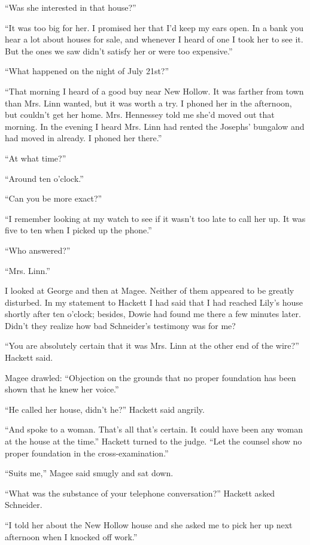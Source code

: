 {“Was she interested in that house?”

“It was too big for her. I promised her that I’d keep my ears open. In a bank you hear a lot about houses for sale, and whenever I heard of one I took her to see it. But the ones we saw didn’t satisfy her or were too expensive.”

“What happened on the night of July 21st?”

“That morning I heard of a good buy near New Hollow. It was farther from town than Mrs. Linn wanted, but it was worth a try. I phoned her in the afternoon, but couldn’t get her home. Mrs. Hennessey told me she’d moved out that morning. In the evening I heard Mrs. Linn had rented the Josephs’ bungalow and had moved in already. I phoned her there.”

“At what time?”

“Around ten o’clock.”

“Can you be more exact?”

“I remember looking at my watch to see if it wasn’t too late to call her up. It was five to ten when I picked up the phone.”

“Who answered?”

“Mrs. Linn.”

I looked at George and then at Magee. Neither of them appeared to be greatly disturbed. In my statement to Hackett I had said that I had reached Lily’s house shortly after ten o’clock; besides, Dowie had found me there a few minutes later. Didn’t they realize how bad Schneider’s testimony was for me?

“You are absolutely certain that it was Mrs. Linn at the other end of the wire?” Hackett said.

Magee drawled: “Objection on the grounds that no proper foundation has been shown that he knew her voice.”

“He called her house, didn’t he?” Hackett said angrily.

“And spoke to a woman. That’s all that’s certain. It could have been any woman at the house at the time.” Hackett turned to the judge. “Let the counsel show no proper foundation in the cross-examination.”

“Suits me,” Magee said smugly and sat down.

“What was the substance of your telephone conversation?” Hackett asked Schneider.

“I told her about the New Hollow house and she asked me to pick her up next afternoon when I knocked off work.”

}
